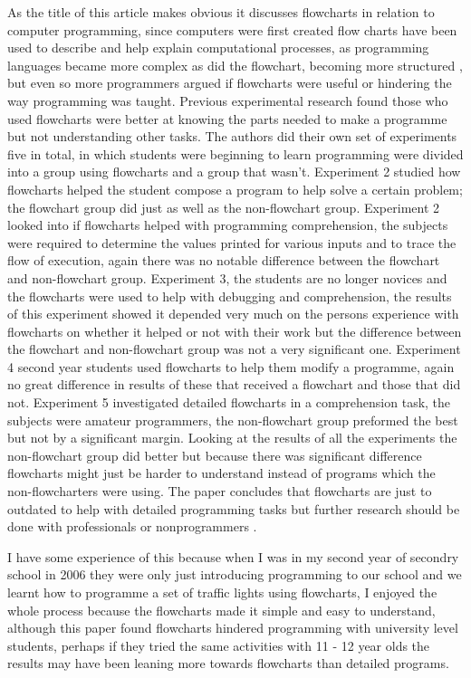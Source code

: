 \documentclass{scrartcl}
\begin{document}
As the title of this article makes obvious it discusses flowcharts in relation to computer programming, since computers were first created flow charts have been used to describe and help explain computational processes, as programming languages became more complex as did the flowchart, becoming more structured \cite{nassi1973flowchart}, but even so more programmers argued if flowcharts were useful or hindering the way programming was taught. Previous experimental research found those who used flowcharts were better at knowing the parts needed to make a programme but not understanding other tasks. The authors did their own set of experiments five in total, in which students were beginning to learn programming were divided into a group using flowcharts and a group that wasn't. Experiment 2 studied how flowcharts helped the student compose a program to help solve a certain problem; the flowchart group did just as well as the non-flowchart group. Experiment 2 looked into if flowcharts helped with programming comprehension, the subjects were required to determine the values printed for various inputs and to trace the flow of execution, again there was no notable difference between the flowchart and non-flowchart group. Experiment 3, the students are no longer novices and the flowcharts were used to help with debugging and comprehension, the results of this experiment showed it depended very much on the persons experience with flowcharts on whether it helped or not with their work but the difference between the flowchart and non-flowchart group was not a very significant one. Experiment 4 second year students used flowcharts to help them modify a programme, again no great difference in results of these that received a flowchart and those that did not. Experiment 5 investigated detailed flowcharts in a comprehension task, the subjects were amateur programmers, the non-flowchart group preformed the best but not by a significant margin. Looking at the results of all the experiments the non-flowchart group did better but because there was significant difference flowcharts might just be harder to understand instead of programs which the non-flowcharters were using. The paper concludes that flowcharts are just to outdated to help with detailed programming tasks but further research should be done with professionals or nonprogrammers \cite{shneiderman1977experimental}.

I have some experience of this because when I was in my second year of secondry school in 2006 they were only just introducing programming to our school and we learnt how to programme a set of traffic lights using flowcharts, I enjoyed the whole process because the flowcharts made it simple and easy to understand, although this paper found flowcharts hindered programming with university level students, perhaps if they tried the same activities with 11 - 12 year olds the results may have been leaning more towards flowcharts than detailed programs.
\end{document}
